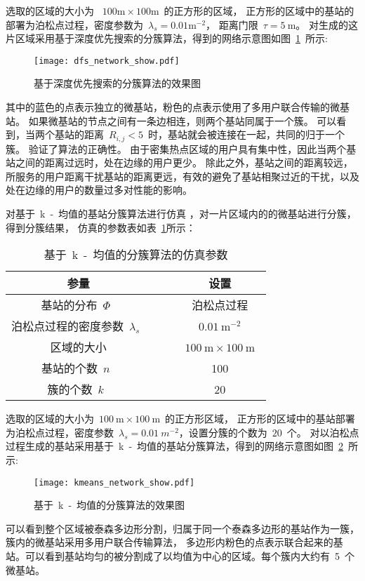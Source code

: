 选取的区域的大小为 ~$100\mathrm{m} \times 100 \mathrm{m}$~的正方形的区域，
正方形的区域中的基站的部署为泊松点过程，密度参数为~$\lambda_s=0.01 \mathrm{m}^{-2}$，
距离门限~$\tau=5~\mathrm{m}$。
对生成的这片区域采用基于深度优先搜索的分簇算法，得到的网络示意图如图~\ref{dfs_network_show}~所示:
\begin{figure}[htbp]
\centering
\texttt{[image: dfs\_network\_show.pdf]}
\caption{基于深度优先搜索的分簇算法的效果图}\vspace{-0.5em}
\label{dfs_network_show}
\end{figure}
其中的蓝色的点表示独立的微基站，粉色的点表示使用了多用户联合传输的微基站。
如果微基站的节点之间有一条边相连，则两个基站同属于一个簇。
可以看到，当两个基站的距离~$R_{i,j} < 5$~时，基站就会被连接在一起，共同的归于一个簇。
验证了算法的正确性。
由于密集热点区域的用户具有集中性，因此当两个基站之间的距离过远时，处在边缘的用户更少。
除此之外，基站之间的距离较远，所服务的用户距离干扰基站的距离更远，有效的避免了基站相聚过近的干扰，以及处在边缘的用户的数量过多对性能的影响。

对基于~k~-~均值的基站分簇算法进行仿真
，对一片区域内的的微基站进行分簇，得到分簇结果，
仿真的参数表如表~\ref{kmeans_show_sim_para}所示：
\begin{table}[htbp]
\caption{基于~k~-~均值的分簇算法的仿真参数}
\label{kmeans_show_sim_para}
\vspace{0.5em}\centering\wuhao
\begin{tabular}{cccc}
\toprule[1.5pt]
参量 & & & 设置 \\
\midrule[0.5pt]
基站的分布~$\Phi$~ & & & 泊松点过程 \\
泊松点过程的密度参数~$\lambda_s$~ & & & ~$0.01~\mathrm{m}^{-2}$~ \\
区域的大小  & & & ~$100~\mathrm{m} \times 100~ \mathrm{m}$~ \\
基站的个数~$n$~  & & & 100\\
簇的个数~$k$~ & & & ~$20$~\\
\bottomrule[1.5pt]
\end{tabular}
\end{table}

选取的区域的大小为~$100~\mathrm{m} \times 100~ \mathrm{m}$~的正方形区域，
正方形的区域中的基站部署为泊松点过程，密度参数~$\lambda_s=0.01~m^{-2}$，设置分簇的个数为~$20$~个。
对以泊松点过程生成的基站采用基于~k~-~均值的基站分簇算法，得到的网络示意图如图~\ref{kmeans_network_show}~所示:
\begin{figure}[htbp]
\centering
\texttt{[image: kmeans\_network\_show.pdf]}
\caption{基于~k~-~均值的分簇算法的效果图}\vspace{-0.5em}
\label{kmeans_network_show}
\end{figure}
可以看到整个区域被泰森多边形分割，归属于同一个泰森多边形的基站作为一簇，簇内的微基站采用多用户联合传输算法，
多边形内粉色的点表示联合起来的基站。可以看到基站均匀的被分割成了以均值为中心的区域。每个簇内大约有~5~个微基站。

